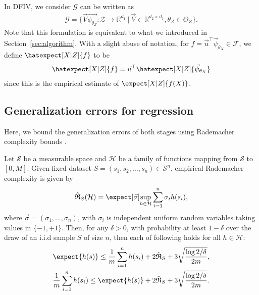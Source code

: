 In DFIV, we consider $\mathcal{G}$ can be written as
\begin{align*}
    \mathcal{G} = \{\vec{V} \vec{\phi_{\theta_Z}}:\mathcal{Z}\to\mathbb{R}^{d_1}~|~ \vec{V} \in \mathbb{R}^{d_2 \times d_1}, \theta_Z \in \Theta_Z\}.
\end{align*}
Note that this formulation is equivalent to what we  introduced in Section~\ref{sec:algorithm}. With a slight abuse of notation, for $f = \vec{u}^\top \vec{\psi}_{\theta_X} \in \mathcal{F}$, we define $\hatexpect[X|Z]{f}$ to be
\begin{align*}
    \hatexpect[X|Z]{f} = \vec{u}^\top \hatexpect[X|Z]{\vec{\psi}_{\theta_X}}
\end{align*}
since this is the empirical estimate of $\expect[X|Z]{f(X)}$.

\subsection{Generalization errors for regression}
Here, we bound the generalization errors of both stages using Rademacher complexity bounds \citep{FoundationOfML}.

\begin{prop}{\citep[Theorem 3.3][with slight modification]{FoundationOfML}} \label{prop:bound}
    Let $\mathcal{S}$ be a measurable space and $\mathcal{H}$ be a family of functions mapping from $\mathcal{S}$ to $[0, M]$. Given fixed dataset $S = (s_1, s_2, \dots, s_n) \in \mathcal{S}^n$, empirical Rademacher complexity is given by
    \begin{align*}
        \hat{\mathfrak{R}}_S(\mathcal{H}) = \expect[\vec{\sigma}]{\sup_{h\in \mathcal{H}} \sum_{i=1}^n \sigma_i h(s_i)},
    \end{align*}
    where $\vec{\sigma}=(\sigma_1,\dots,\sigma_n)$, 
    with $\sigma_i$ is independent uniform random variables taking values in $\{-1,+1\}$. Then, for any $\delta > 0$, with probability at least $1-\delta$ over the draw of an i.i.d sample $S$ of size $n$, then each of following holds for all $h \in \mathcal{H}$:
    \begin{align*}
        &\expect{h(s)} \leq \frac1m \sum_{i=1}^n h(s_i) + 2 \hat{\mathfrak{R}}_S + 3 \sqrt{\frac{\log 2/\delta}{2m}},\\
        & \frac1m \sum_{i=1}^n h(s_i) \leq \expect{h(s)} + 2 \hat{\mathfrak{R}}_S + 3 \sqrt{\frac{\log 2/\delta}{2m}}.
    \end{align*}
\end{prop}

